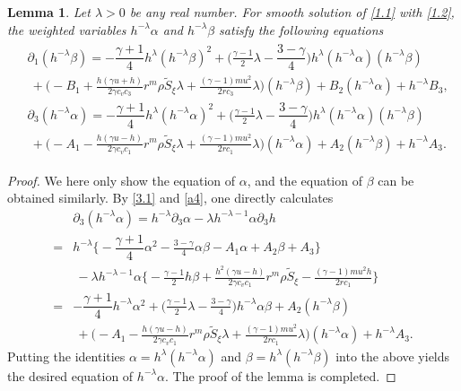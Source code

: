 \documentclass[11pt,reqno]{article}
\newtheorem{lem}{Lemma}[section]
\newcommand{\fr}{\frac}
\newcommand{\pa}{\partial}
\numberwithin{equation}{section}
\begin{document}
\begin{lem}\label{lem6}
Let $\lambda>0$ be any real number. For smooth solution of \eqref{1.1} with \eqref{1.2}, the
weighted variables $h^{-\lambda}\alpha$ and $h^{-\lambda}\beta$ satisfy the following equations
\begin{align}\label{4.23}
\begin{split}
& \pa_1 (h^{-\lambda}\beta) =-\dfrac{\gamma+1}{4}h^{\lambda} (h^{-\lambda}\beta)^{2}
  +\Big(\fr{\gamma-1}{2}\lambda-\dfrac{3-\gamma}{4}\Big) h^{\lambda}(h^{-\lambda}\alpha) (h^{-\lambda}\beta) \\
  &\ +\Big(-B_{1}+\fr{h(\gamma u+h)}{2\gamma c_v c_3}r^m\rho \widetilde{S}_\xi \lambda +\fr{(\gamma-1)mu^2}{2rc_3}\lambda\Big)(h^{-\lambda}\beta)+ B_{2} (h^{-\lambda}\alpha) +h^{-\lambda}B_3, \\[4pt]
& \pa_3 (h^{-\lambda}\alpha) =-\dfrac{\gamma+1}{4}h^{\lambda} (h^{-\lambda}\alpha)^{2}
  +\Big(\fr{\gamma-1}{2}\lambda-\dfrac{3-\gamma}{4}\Big) h^{\lambda}(h^{-\lambda}\alpha) (h^{-\lambda}\beta)\\
  &\ +\Big(-A_{1}-\fr{h(\gamma u-h)}{2\gamma c_v c_1}r^m\rho \widetilde{S}_\xi \lambda +\fr{(\gamma-1)mu^2}{2rc_1}\lambda\Big)(h^{-\lambda}\alpha)+ A_{2} (h^{-\lambda}\beta) +h^{-\lambda}A_3.
\end{split}
\end{align}
\end{lem}
\begin{proof}
We here only show the equation of $\alpha$, and the equation of $\beta$ can be obtained similarly. By \eqref{3.1} and \eqref{a4}, one directly calculates
\begin{align*}
&\pa_3 (h^{-\lambda}\alpha) =h^{-\lambda}\pa_3\alpha -\lambda h^{-\lambda-1}\alpha\pa_3h \\
=&h^{-\lambda}\bigg\{-\dfrac{\gamma+1}{4} \alpha^{2}
  -\frac{3-\gamma}{4} \alpha \beta-A_{1}\alpha+ A_{2} \beta +A_3\bigg\} \\
&\ -\lambda h^{-\lambda-1}\alpha\bigg\{-\frac{\gamma-1}{2}h\beta
    +\frac{h^2(\gamma u-h)}{2\gamma c_vc_1}r^m\rho \widetilde{S}_\xi
    -\frac{(\gamma-1)mu^2h}{2rc_1}\bigg\} \\
=&-\dfrac{\gamma+1}{4}h^{-\lambda} \alpha^{2} +\Big(\frac{\gamma-1}{2}\lambda -\frac{3-\gamma}{4}\Big)h^{-\lambda}\alpha \beta +A_2(h^{-\lambda}\beta) \\
&\ +\Big(-A_{1}-\fr{h(\gamma u-h)}{2\gamma c_v c_1}r^m\rho \widetilde{S}_\xi \lambda +\fr{(\gamma-1)mu^2}{2rc_1}\lambda\Big)(h^{-\lambda}\alpha) +h^{-\lambda}A_3.
\end{align*}
Putting the identities $\alpha=h^\lambda(h^{-\lambda}\alpha)$ and $\beta=h^\lambda(h^{-\lambda}\beta)$ into the above yields the desired equation of $h^{-\lambda}\alpha$. The proof of the lemma is completed.
\end{proof}
\end{document}
